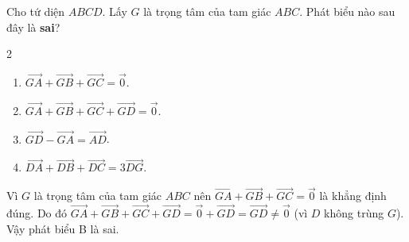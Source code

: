 \begin{baitap}
	Cho tứ diện $ABCD$. Lấy $G$ là trọng tâm của tam giác $ABC$. Phát biểu nào sau đây là \textbf{sai}?
	\begin{multicols}{2}
		\begin{enumerate}
			\item $\overrightarrow{GA} + \overrightarrow{GB} + \overrightarrow{GC} = \overrightarrow{0}$.
			\item $\overrightarrow{GA} + \overrightarrow{GB} + \overrightarrow{GC} + \overrightarrow{GD} = \overrightarrow{0}$.
			\item $\overrightarrow{GD} - \overrightarrow{GA} = \overrightarrow{AD}$.
			\item $\overrightarrow{DA} + \overrightarrow{DB} + \overrightarrow{DC} = 3\overrightarrow{DG}$.
		\end{enumerate}
	\end{multicols}
	\begin{traloi}
		Vì $G$ là trọng tâm của tam giác $ABC$ nên $\overrightarrow{GA} + \overrightarrow{GB} + \overrightarrow{GC} = \overrightarrow{0}$ là khẳng định đúng.
		Do đó $\overrightarrow{GA} + \overrightarrow{GB} + \overrightarrow{GC} + \overrightarrow{GD} = \overrightarrow{0} + \overrightarrow{GD} = \overrightarrow{GD} \ne \overrightarrow{0}$ (vì $D$ không trùng $G$).
		Vậy phát biểu B là sai.
	\end{traloi}
\end{baitap}

